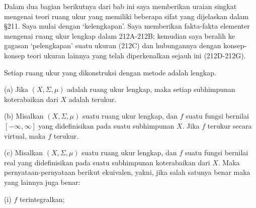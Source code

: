 
\def\chaptername{Taksonomi ruang ukur}
\def\sectionname{Ruang lengkap}


Dalam dua bagian berikutnya dari bab ini saya memberikan uraian singkat
mengenai teori ruang ukur yang memiliki beberapa sifat yang dijelaskan
dalam \S211. Saya mulai dengan `kelengkapan'. Saya memberikan
fakta-fakta elementer mengenai ruang ukur lengkap dalam 212A-212B;
kemudian saya beralih ke gagasan `pelengkapan' suatu ukuran (212C) dan
hubungannya dengan konsep-konsep teori ukuran lainnya yang telah
diperkenalkan sejauh ini (212D-212G).

 Setiap ruang ukur yang dikonstruksi
dengan metode \Caratheodory adalah lengkap.


 (a) Jika $(X,\Sigma,\mu)$ adalah ruang ukur
lengkap, maka setiap subhimpunan koterabaikan dari $X$ adalah terukur.

(b) Misalkan $(X,\Sigma,\mu)$ suatu ruang ukur lengkap, dan $f$ suatu
fungsi bernilai $[-\infty,\infty]$ yang didefinisikan pada suatu
subhimpunan $X$. Jika $f$ terukur secara virtual, maka $f$ terukur.

(c) Misalkan $(X,\Sigma,\mu)$ suatu ruang ukur lengkap, dan $f$ suatu
fungsi bernilai real yang didefinisikan pada suatu subhimpunan
koterabaikan dari $X$. Maka pernyataan-pernyataan berikut ekuivalen,
yakni, jika salah satunya benar maka yang lainnya juga benar:

\quad (i) $f$ terintegralkan;

